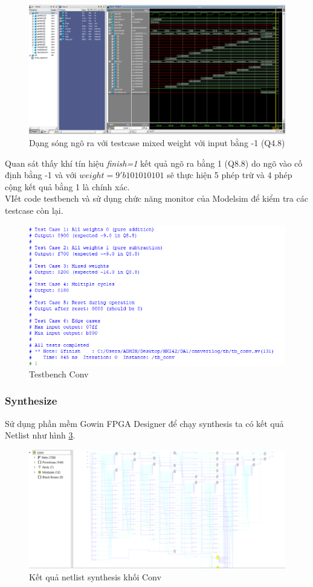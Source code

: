 \begin{figure}[H]
    \centering
    \includegraphics[width=0.9\linewidth]{Images/waveconv.png}
    \caption{Dạng sóng ngõ ra với testcase mixed weight với input bằng -1 (Q4.8)}
    \label{fig:enter-label}
\end{figure}
Quan sát thấy khí tín hiệu \textit{finish=1} kết quả ngõ ra bằng 1 (Q8.8) do ngõ vào cố định bằng -1 và với $weight=9'b101010101$ sẽ thực hiện 5 phép trừ và 4 phép cộng kết quả bằng 1 là chính xác. \\

VIết code testbench và sử dụng chức năng monitor của Modelsim để kiểm tra các testcase còn lại.
\begin{figure}[H]
    \centering
    \includegraphics[width=0.75\linewidth]{Images/convtestcase.png}
    \caption{Testbench Conv}
    \label{fig:enter-label}
\end{figure}

\subsubsection{Synthesize}
Sử dụng phần mềm Gowin FPGA Designer để chạy synthesis ta có kết quả Netlist như hình \ref{fig:convsynth}.
\begin{figure}[H]
    \centering
    \includegraphics[width=0.75\linewidth]{Images/convsynth.png}
    \caption{Kết quả netlist synthesis khối Conv}
    \label{fig:convsynth}
\end{figure}

